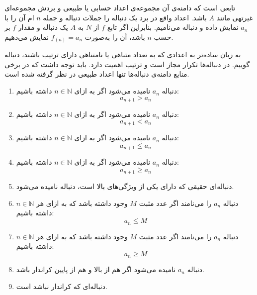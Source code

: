 \begin{definition}
	\p
{}
تابعی است که دامنه‌ی آن مجموعه‌ی اعداد حسابی یا طبیعی و بردش مجموعه‌ای غیرتهی مانند
 $A$
 باشد. اعداد واقع در برد یک دنباله را جملات دنباله و جمله 
 $n$ 
 ام آن را با
 $a_n$
 نمایش داده و 
  دنباله می‌نامیم. بنابراین اگر تابع
$f$
  از
$N$
  به
$A$ 
  یک دنباله و مقدار 
$f$
  بر حسب
$n$
    باشد، آن را به‌صورت
$f_(n) = a_n$
  نمایش می‌دهیم.
\end{definition}

	\p
به زبان ساده‌تر به اعدادی که به تعداد متناهی یا نامتناهی دارای ترتیب باشند، دنباله گوییم. در دنباله‌ها تکرار مجاز است و ترتیب اهمیت دارد.
باید توجه داشت که در برخی منابع دامنه‌ی دنباله‌ها تنها اعداد طبیعی در نظر گرفته شده است.

\begin{definition}
\begin{enumerate}

\item
 دنباله
$a_n$
  نامیده می‌شود اگر به ازای
$n \in \mathbb{N}$
 داشته باشیم:
$$a_{n+1} > a_n$$

\item
 دنباله
$a_n$
  نامیده می‌شود اگر به ازای
$n \in \mathbb{N}$
 داشته باشیم:
$$a_{n+1} < a_n$$

\item
 دنباله
$a_n$
  نامیده می‌شود اگر به ازای
$n \in \mathbb{N}$
 داشته باشیم:
$$a_{n+1} \leq a_n$$

\item
 دنباله
$a_n$
  نامیده می‌شود اگر به ازای
$n \in \mathbb{N}$
 داشته باشیم:
$$a_{n+1} \geq a_n$$

\item
 دنباله‌ای حقیقی  که دارای یکی از ویژگی‌های بالا است، دنباله 
 نامیده می‌شود.

\item
 دنباله
$a_n$
 را  
  می‌نامند اگر عدد مثبت 
 $M$
 وجود داشته باشد که به ازای هر
$n \in \mathbb{N}$
 داشته باشیم:
$$a_{n} \leq M$$

\item
 دنباله
$a_n$
 را 
  می‌نامند اگر عدد مثبت 
 $M$
 وجود داشته باشد که به ازای هر
$n \in \mathbb{N}$
 داشته باشیم:
$$a_{n} \geq M$$

\item
 دنباله
$a_n$
 نامیده می‌شود اگر هم از بالا و هم از پایین کراندار باشد.

\item
دنباله‌ای که کراندار نباشد 
 است.
\end{enumerate}
\end{definition}



